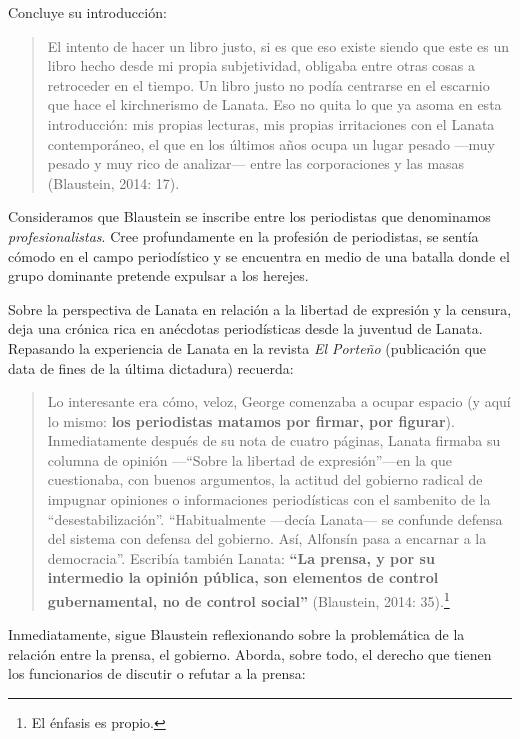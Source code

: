{Concluye su introducción:

\begin{quote}
El intento de hacer un libro justo, si es que eso existe siendo que este es un libro hecho desde mi propia subjetividad, obligaba entre otras cosas a retroceder en el tiempo. Un libro justo no podía centrarse en el escarnio que hace el kirchnerismo de Lanata. Eso no quita lo que ya asoma en esta introducción: mis propias lecturas, mis propias irritaciones con el Lanata contemporáneo, el que en los últimos años ocupa un lugar pesado ---muy pesado y muy rico de analizar--- entre las corporaciones y las masas (Blaustein, 2014: 17).
\end{quote}

Consideramos que Blaustein se inscribe entre los periodistas que denominamos \emph{profesionalistas}. Cree profundamente en la profesión de periodistas, se sentía cómodo en el campo periodístico y se encuentra en medio de una batalla donde el grupo dominante pretende expulsar a los herejes.

Sobre la perspectiva de Lanata en relación a la libertad de expresión y la censura, deja una crónica rica en anécdotas periodísticas desde la juventud de Lanata. Repasando la experiencia de Lanata en la revista \emph{El Porteño} (publicación que data de fines de la última dictadura) recuerda:

\begin{quote}
Lo interesante era cómo, veloz, George comenzaba a ocupar espacio (y aquí lo mismo: \textbf{los periodistas matamos por firmar, por figurar}). Inmediatamente después de su nota de cuatro páginas, Lanata firmaba su columna de opinión ---``Sobre la libertad de expresión''---en la que cuestionaba, con buenos argumentos, la actitud del gobierno radical de impugnar opiniones o informaciones periodísticas con el sambenito de la ``desestabilización''. ``Habitualmente ---decía Lanata--- se confunde defensa del sistema con defensa del gobierno. Así, Alfonsín pasa a encarnar a la democracia''. Escribía también Lanata: \textbf{``La prensa, y por su intermedio la opinión pública, son elementos de control gubernamental, no de control social''} (Blaustein, 2014: 35).\footnote{El énfasis es propio.}
\end{quote}

Inmediatamente, sigue Blaustein reflexionando sobre la problemática de la relación entre la prensa, el gobierno. Aborda, sobre todo, el derecho que tienen los funcionarios de discutir o refutar a la prensa:

}
